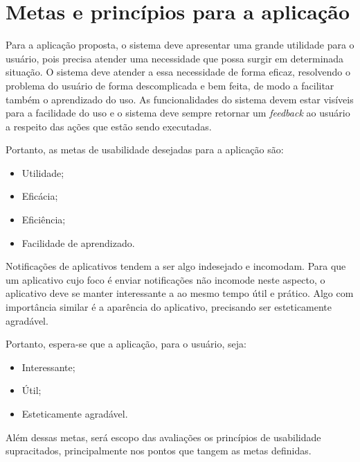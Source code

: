     \section{Metas e princípios para a aplicação}
    
      Para a aplicação proposta, o sistema deve apresentar uma grande utilidade para o usuário, pois precisa atender uma necessidade
      que possa surgir em determinada situação. O sistema deve atender a essa necessidade de forma eficaz, resolvendo o problema
      do usuário de forma descomplicada e bem feita, de modo a facilitar também o aprendizado do uso. As funcionalidades do sistema
      devem estar visíveis para a facilidade do uso e o sistema deve sempre retornar um \textit{feedback} ao usuário a respeito
      das ações que estão sendo executadas.
      
      Portanto, as metas de usabilidade desejadas para a aplicação são:
      
      \begin{itemize}
	\item Utilidade;
	\item Eficácia;
	\item Eficiência;
	\item Facilidade de aprendizado.
      \end{itemize}
          
      Notificações de aplicativos tendem a ser algo indesejado e incomodam. Para que um aplicativo cujo foco é enviar notificações
      não incomode neste aspecto, o aplicativo deve se manter interessante a ao mesmo tempo útil e prático. Algo com importância similar
      é a aparência do aplicativo, precisando ser esteticamente agradável.
      
      Portanto, espera-se que a aplicação, para o usuário, seja:
      
      \begin{itemize}
       \item Interessante;
       \item Útil;
       \item Esteticamente agradável.
      \end{itemize}
      
      Além dessas metas, será escopo das avaliações os princípios de usabilidade supracitados, principalmente nos pontos que tangem as 
      metas definidas.

      
    